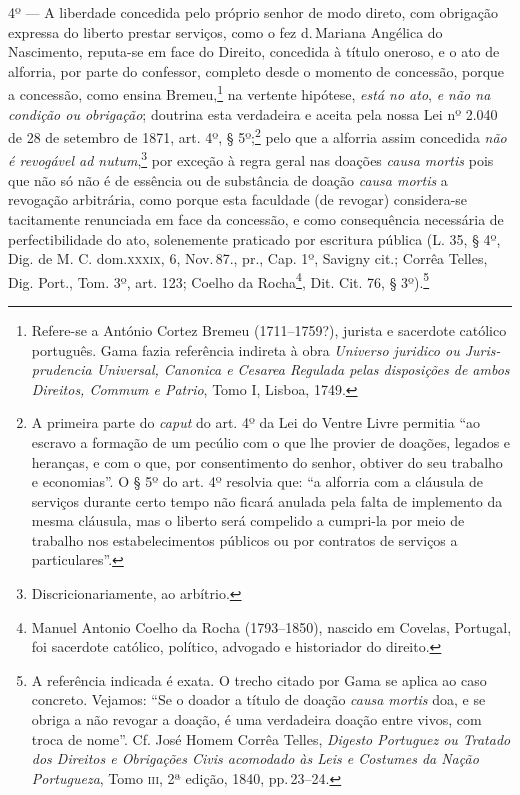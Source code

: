 4º --- A liberdade concedida pelo próprio senhor de modo direto, com
obrigação expressa do liberto prestar serviços, como o fez d.\,Mariana
Angélica do Nascimento, reputa-se em face do Direito, concedida à título
oneroso, e o ato de alforria, por parte do confessor, completo desde o
momento de concessão, porque a concessão, como ensina Bremeu,\footnote{
  Refere-se a António Cortez Bremeu (1711--1759?), jurista e sacerdote
  católico português. Gama fazia referência indireta à obra
  \emph{Universo juridico ou Juris-prudencia Universal, Canonica e
  Cesarea Regulada pelas disposições de ambos Direitos, Commum e
  Patrio}, Tomo I, Lisboa, 1749.} na vertente hipótese, \emph{está no
ato}, \emph{e não na condição ou obrigação}; doutrina esta verdadeira e
aceita pela nossa Lei nº 2.040 de 28 de setembro de 1871, art. 4º, §
5º;\footnote{ A primeira parte do \emph{caput} do art. 4º da Lei do
  Ventre Livre permitia ``ao escravo a formação de um pecúlio com o que
  lhe provier de doações, legados e heranças, e com o que, por
  consentimento do senhor, obtiver do seu trabalho e economias''. O § 5º
  do art. 4º resolvia que: ``a alforria com a cláusula de serviços
  durante certo tempo não ficará anulada pela falta de implemento da
  mesma cláusula, mas o liberto será compelido a cumpri-la por meio de
  trabalho nos estabelecimentos públicos ou por contratos de serviços a
  particulares''.} pelo que a alforria assim concedida \emph{não é
revogável ad nutum},\footnote{ Discricionariamente, ao arbítrio.} por
exceção à regra geral nas doações \emph{causa mortis} pois que não só
não é de essência ou de substância de doação \emph{causa mortis} a
revogação arbitrária, como porque esta faculdade (de revogar)
considera-se tacitamente renunciada em face da concessão, e como
consequência necessária de perfectibilidade do ato, solenemente
praticado por escritura pública (L. 35, § 4º, Dig. de M. C. dom.\textsc{xxxix},
6, Nov.\,87., pr., Cap. 1º, Savigny cit.; Corrêa Telles, Dig. Port., Tom.
3º, art. 123; Coelho da Rocha\footnote{ Manuel Antonio Coelho da Rocha
  (1793--1850), nascido em Covelas, Portugal, foi sacerdote católico,
  político, advogado e historiador do direito.}, Dit. Cit. 76, §
3º).\footnote{ A referência indicada é exata. O trecho citado por Gama
  se aplica ao caso concreto. Vejamos: ``Se o doador a título de doação
  \emph{causa mortis} doa, e se obriga a não revogar a doação, é uma
  verdadeira doação entre vivos, com troca de nome''. Cf. José Homem
  Corrêa Telles, \emph{Digesto Portuguez ou Tratado dos Direitos e
  Obrigações Civis acomodado às Leis e Costumes da Nação Portugueza},
  Tomo \textsc{iii}, 2ª edição, 1840, pp.\,23--24.}

